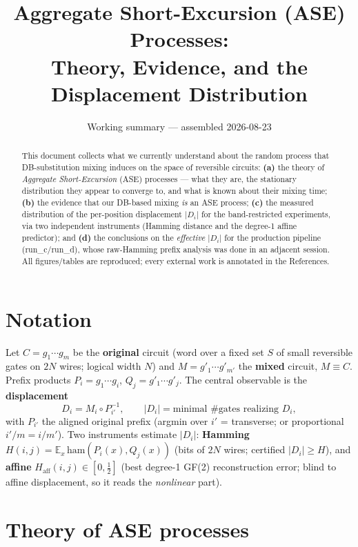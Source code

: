\documentclass[11pt]{article}
\title{Aggregate Short-Excursion (ASE) Processes:\\Theory, Evidence, and the Displacement Distribution}
\date{Working summary --- assembled 2026-08-23}
\author{}
\newcommand{\Di}{\lvert D_i\rvert}
\begin{document}
\maketitle
\vspace{-2.3em}

\begin{abstract}
This document collects what we currently understand about the random process that DB-substitution
mixing induces on the space of reversible circuits: \textbf{(a)} the theory of \emph{Aggregate
Short-Excursion} (ASE) processes --- what they are, the stationary distribution they appear to
converge to, and what is known about their mixing time; \textbf{(b)} the evidence that our DB-based
mixing \emph{is} an ASE process; \textbf{(c)} the measured distribution of the per-position
displacement $\Di$ for the band-restricted experiments, via two independent instruments (Hamming
distance and the degree-1 affine predictor); and \textbf{(d)} the conclusions on the \emph{effective}
$\Di$ for the production pipeline (run\_c/run\_d), whose raw-Hamming prefix analysis was done in an
adjacent session. All figures/tables are reproduced; every external work is annotated in the
References.
\end{abstract}

\section*{Notation}
Let $C=g_1\cdots g_m$ be the \textbf{original} circuit (word over a fixed set $S$ of small reversible
gates on $2N$ wires; logical width $N$) and $M=g'_1\cdots g'_{m'}$ the \textbf{mixed} circuit,
$M\equiv C$. Prefix products $P_i=g_1\cdots g_i$, $Q_j=g'_1\cdots g'_j$. The central observable is the
\textbf{displacement}
\[
  D_i = M_i\circ P_{i'}^{-1},\qquad \Di=\text{minimal \# gates realizing }D_i,
\]
with $P_{i'}$ the aligned original prefix (argmin over $i'$ = transverse; or proportional
$i'/m=i/m'$). Two instruments estimate $\Di$: \textbf{Hamming}
$H(i,j)=\mathbb{E}_x\,\mathrm{ham}(P_i(x),Q_j(x))$ (bits of $2N$ wires; certified $\Di\ge H$), and
\textbf{affine} $H_{\mathrm{aff}}(i,j)\in[0,\tfrac12]$ (best degree-1 GF(2) reconstruction error;
blind to affine displacement, so it reads the \emph{nonlinear} part).

\section{Theory of ASE processes}
\end{document}
